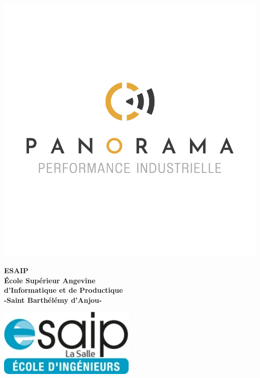\begin{titlepage}
\begin{center}
	\begin{minipage}{2.5cm}
	\begin{center}
		 \includegraphics[scale=0.25]{img/Logo_PANORAMA_Fond-BLANC.jpg}
		
	\end{center}
\end{minipage}\hfill
\begin{minipage}{10cm}
	\begin{center}
	\textbf{ESAIP}\\[0.1cm]
    \textbf{École Supérieur Angevine \\d'Informatique et de Productique}\\[0.1cm]
    \textbf{-Saint Barthélémy d'Anjou-}
		
	\end{center}
\end{minipage}\hfill
\begin{minipage}{2.5cm}
	\begin{center}
		\includegraphics[scale=2.5]{img/logo_ESAIP_INGENIEUR_RVB_2016-250.jpg}
	\end{center}


\end{minipage}
\end{center}
\end{titlepage}
